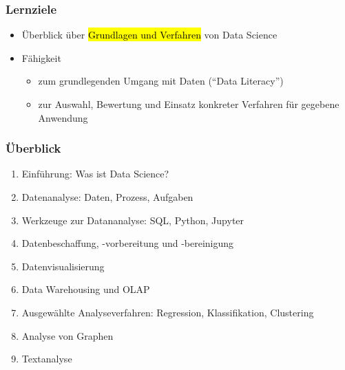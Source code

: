   
  \begin{frame}
  
    \frametitle{Lernziele}
  
  \begin{itemize}
  \item Überblick über \hl{Grundlagen und Verfahren} von Data Science
  \item Fähigkeit 
  \begin{itemize}
  \item zum grundlegenden Umgang mit Daten ("`Data Literacy"')
  \item zur Auswahl, Bewertung und Einsatz konkreter Verfahren für
    gegebene Anwendung 
  \end{itemize}
\end{itemize}
  
  \end{frame}

  
  \begin{frame}
    \frametitle{Überblick}
  
    \begin{enumerate}
    \item<1-> Einführung: Was ist Data Science?
    \item<2-> Datenanalyse: Daten, Prozess, Aufgaben
    \item<3-> Werkzeuge zur Datananalyse: SQL, Python, Jupyter
    \item<4-> Datenbeschaffung, -vorbereitung und -bereinigung
    \item<5-> Datenvisualisierung
    \item<6-> Data Warehousing und OLAP
    \item<7-> Ausgewählte Analyseverfahren: Regression, Klassifikation, Clustering
    \item<8-> Analyse von Graphen
    \item<9-> Textanalyse
   \end{enumerate}
  
  \end{frame}
  
  
